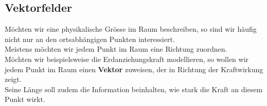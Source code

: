 \newpage






\subsection{Vektorfelder}
Möchten wir eine physikalische Grösse im Raum beschreiben, so sind wir häufig nicht nur an den ortsabhängigen Punkten interessiert. \\
Meistens möchten wir jedem Punkt im Raum eine Richtung zuordnen. \\
Möchten wir beispielsweise die Erdanziehungskraft modellieren, so wollen wir jedem Punkt im Raum einen \textbf{Vektor} zuweisen, der in Richtung der Kraftwirkung zeigt. \\
Seine Länge soll zudem die Information beinhalten, wie stark die Kraft an diesem Punkt wirkt.










%
%
%
%
%
%
%
%
%
%
%
%
%
%
%
%
%
%
%
%
%
%
%
%

